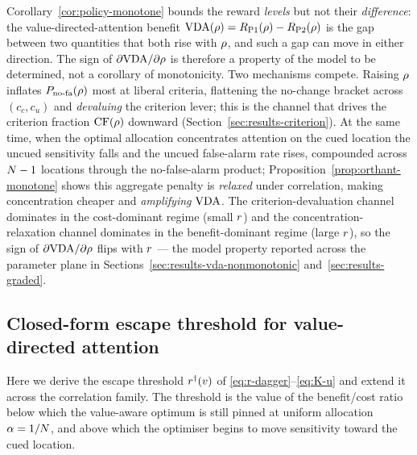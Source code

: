 Corollary~\ref{cor:policy-monotone} bounds the reward \emph{levels} but
not their \emph{difference}: the value-directed-attention benefit
$\mathrm{VDA}(\rho) = R_{\mathrm{P1}}(\rho) - R_{\mathrm{P2}}(\rho)$ is the gap between two
quantities that both rise with $\rho$, and such a gap can move in
either direction. The sign of $\partial \mathrm{VDA} / \partial \rho$ is
therefore a property of the model to be determined, not a corollary of
monotonicity. Two mechanisms compete. Raising $\rho$ inflates
$P_{\mathrm{no\text{-}fa}}(\rho)$ most at liberal criteria, flattening the no-change
bracket across $(c_c, c_u)$ and \emph{devaluing} the criterion lever;
this is the channel that drives the criterion fraction $\mathrm{CF}(\rho)$
downward (Section~\ref{sec:results-criterion}). At the same time, when
the optimal allocation concentrates attention on the cued location the
uncued sensitivity falls and the uncued false-alarm rate rises,
compounded across $N - 1$ locations through the no-false-alarm
product; Proposition~\ref{prop:orthant-monotone} shows this aggregate
penalty is \emph{relaxed} under correlation, making concentration
cheaper and \emph{amplifying} $\mathrm{VDA}$. The criterion-devaluation channel
dominates in the cost-dominant regime (small $r$) and the
concentration-relaxation channel dominates in the benefit-dominant
regime (large $r$), so the sign of $\partial \mathrm{VDA} / \partial \rho$
flips with $r$ — the model property reported across the parameter
plane in Sections~\ref{sec:results-vda-nonmonotonic}
and~\ref{sec:results-graded}.

\subsection{Closed-form escape threshold for value-directed attention}
\label{sec:supp-escape}

Here we derive the escape threshold $r^{\dagger}(v)$ of
\eqref{eq:r-dagger}--\eqref{eq:K-u} and extend it across the correlation
family. The threshold is the value of the benefit/cost ratio below which
the value-aware optimum is still pinned at uniform allocation
$\alpha = 1/N$, and above which the optimiser begins to move
sensitivity toward the cued location.

